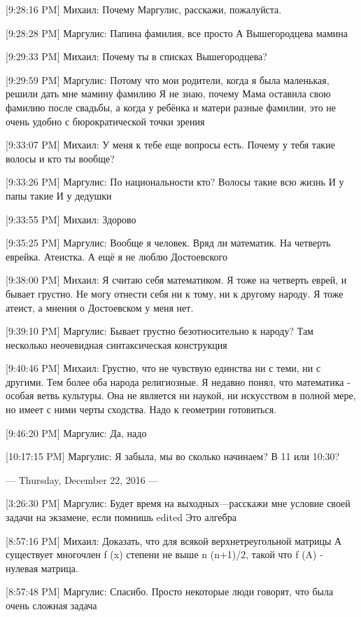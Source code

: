 \documentclass{article}
\begin{document}
[9:28:16 PM] Михаил:
Почему Маргулис, расскажи, пожалуйста.

[9:28:28 PM] Маргулис:
Папина фамилия, все просто
 А Вышегородцева мамина

[9:29:33 PM] Михаил:
Почему ты в списках Вышегородцева?

[9:29:59 PM] Маргулис:
Потому что мои родители, когда я была маленькая, решили дать мне мамину фамилию
 Я не знаю, почему
 Мама оставила свою фамилию после свадьбы, а когда у ребёнка и матери разные фамилии, это не очень удобно с бюрократической точки зрения

[9:33:07 PM] Михаил:
У меня к тебе еще вопросы есть. Почему у тебя такие волосы и кто ты вообще?

[9:33:26 PM] Маргулис:
По национальности кто?
 Волосы такие всю жизнь
 И у папы такие
 И у дедушки

[9:33:55 PM] Михаил:
Здорово

[9:35:25 PM] Маргулис:
Вообще я человек. Вряд ли математик. На четверть еврейка. Атеистка. А ещё я не люблю Достоевского

[9:38:00 PM] Михаил:
Я считаю себя математиком. Я тоже на четверть еврей, и бывает грустно. Не могу отнести себя ни к тому, ни к другому народу. Я тоже атеист, а мнения о Достоевском у меня нет.

[9:39:10 PM] Маргулис:
Бывает грустно безотносительно к народу? Там несколько неочевидная синтаксическая конструкция

[9:40:46 PM] Михаил:
Грустно, что не чувствую единства ни с теми, ни с другими. Тем более оба народа религиозные.
 Я недавно понял, что математика - особая ветвь культуры. Она не является ни наукой, ни искусством в полной мере, но имеет с ними черты сходства.
 Надо к геометрии готовиться.

[9:46:20 PM] Маргулис:
Да, надо

[10:17:15 PM] Маргулис:
Я забыла, мы во сколько начинаем? В 11 или 10:30?

--- Thursday, December 22, 2016 ---

[3:26:30 PM] Маргулис:
Будет время на выходных—расскажи мне условие своей задачи на экзамене, если помнишь
edited 
Это алгебра

[8:57:16 PM] Михаил:
Доказать, что для всякой верхнетреугольной матрицы А существует многочлен f (x) степени не выше n (n+1)/2, такой что  f (A) - нулевая матрица.

[8:57:48 PM] Маргулис:
Спасибо. Просто некоторые люди говорят, что была очень сложная задача
\end{document}
